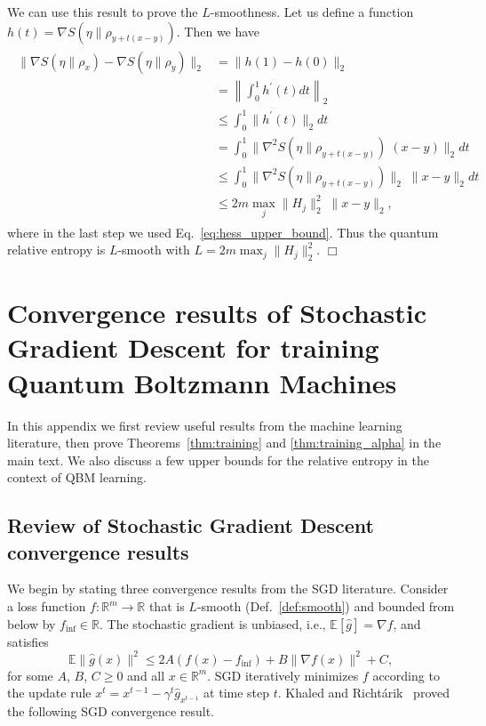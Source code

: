 \documentclass[
    aps,
    prx,
    floatfix,
    nofootinbib,
    onecolumn
]{revtex4-2}
\begin{document}
We can use this result to prove the $L$-smoothness. Let us define a function $h(t) = \nabla S(\eta \|\rho_{y + t(x - y)})$. Then we have
\begin{align}
\begin{split}
\| \nabla S(\eta \|\rho_{x}) - \nabla S(\eta \|\rho_{y}) \|_2 &= \| h(1) - h(0) \|_2 \\
&= \left\| \int_0^1 h^\prime(t) dt \right\|_2 \\
&\leq \int_0^1 \| h^\prime (t) \|_2 dt \\ 
&= \int_0^1 \| \nabla^2 S(\eta \|\rho_{y + t(x - y)}) \; (x - y) \|_2 dt  \\
&\leq \int_0^1 \| \nabla^2 S(\eta \|\rho_{y + t(x - y)}) \|_2 \; \| x - y \|_2  dt \\
&\leq 2m \max_j \| H_j \|_2^2 \; \| x - y \|_2 ,
\end{split}
\end{align}
where in the last step we used Eq.~\eqref{eq:hess_upper_bound}. Thus the quantum relative entropy is $L$-smooth with $L=2m \max_j \| H_j \|_2^2$. $\Box$

\section{Convergence results of Stochastic Gradient Descent for training Quantum Boltzmann Machines}
\label{app:thm1proof}

In this appendix we first review useful results from the machine learning literature, then prove Theorems~\ref{thm:training} and \ref{thm:training_alpha} in the main text. We also discuss a few upper bounds for the relative entropy in the context of QBM learning.  

\subsection{Review of Stochastic Gradient Descent convergence results}

We begin by stating three convergence results from the SGD literature. Consider a loss function $f : \mathbb{R}^m \rightarrow \mathbb{R}$ that is $L$-smooth (Def.~\ref{def:smooth}) and bounded from below by $f_\mathrm{inf} \in \mathbb{R}$. The stochastic gradient is unbiased, i.e., $\mathbb{E}[\hat{g}] = \nabla f$, and satisfies 
\begin{equation}
    \mathbb{E} \| \hat{g}(x) \|^2  \leq 2A (f(x) - f_\mathrm{inf}) + B \| \nabla f(x) \|^2 + C ,
\end{equation}
for some $A$, $B$, $C \geq 0$ and all $x \in \mathbb{R}^m$.
SGD iteratively minimizes $f$ according to the update rule $x^t = x^{t-1} - \gamma^t \hat{g}_{x^{t-1}}$ at time step $t$. Khaled and Richt{\'a}rik~\cite{Khaled2020} proved the following SGD convergence result.
\end{document}
